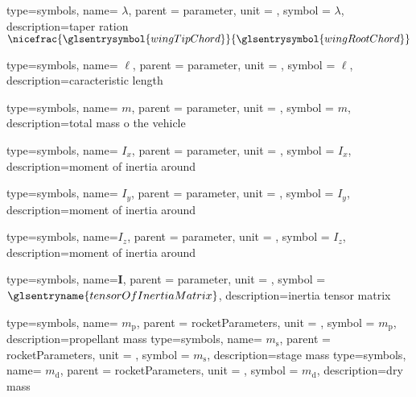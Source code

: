 {type=symbols,
  name= \ensuremath{\lambda},
  parent = {parameter},
  unit = \unexpanded{},
  symbol = \ensuremath{\lambda},
  description={taper ration $\nicefrac{\glsentrysymbol{wingTipChord}}{\glsentrysymbol{wingRootChord}}$}
}

{type=symbols,
  name= \ensuremath{\ell},
  parent = {parameter},
  unit = \unexpanded{\si{\meter}},
  symbol = \ensuremath{\ell},
  description={caracteristic length}
}


{type=symbols,
  name= \ensuremath{m},
  parent = {parameter},
  unit = \unexpanded{\si{\kilogram}},
  symbol = \ensuremath{m},
  description={total mass o the vehicle}
}

{type=symbols,
  name= \ensuremath{I_{x}},
  parent = {parameter},
  unit = \unexpanded{\si{\kilogram\meter\squared}},
  symbol = \ensuremath{I_{x}},
  description={moment of inertia around }
}


{type=symbols,
  name= \ensuremath{I_{y}},
  parent = {parameter},
  unit = \unexpanded{\si{\kilogram\meter\squared}},
  symbol = \ensuremath{I_{y}},
  description={moment of inertia around }
}

{type=symbols,
  name=\ensuremath{I_{z}},
  parent = {parameter},
  unit = \unexpanded{\si{\kilogram\meter\squared}},
  symbol = \ensuremath{I_{z}},
  description={moment of inertia around }
}


{type=symbols,
  name=\ensuremath{\mathbf{I}},
  parent = {parameter},
  unit = \unexpanded{\si{\kilogram\meter\squared}},
  symbol = \ensuremath{\glsentryname{tensorOfInertiaMatrix}},
  description={inertia tensor matrix}
}

{type=symbols,
  name= \ensuremath{m_\mathrm{p}},
  parent = {rocketParameters},
  unit = \unexpanded{\si{\kilogram}},
  symbol = \ensuremath{m_\mathrm{p}},
  description={propellant mass}
}
{type=symbols,
  name= \ensuremath{m_\mathrm{s}},
  parent = {rocketParameters},
  unit = \unexpanded{\si{\kilogram}},
  symbol = \ensuremath{m_\mathrm{s}},
  description={stage mass}
}
{type=symbols,
  name= \ensuremath{{m}_\mathrm{d}},
  parent = {rocketParameters},
  unit = \unexpanded{\si{\kilogram}},
  symbol = \ensuremath{{m}_\mathrm{d}},
  description={dry mass}
}

